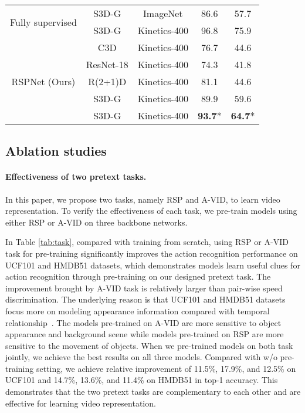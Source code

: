 \documentclass[final]{cvpr}
\begin{document}
\begin{table*}[ht]
\begin{tabular}{ccccc}
		
\hline
		\multirow{2}{*}{Fully supervised} & S3D-G & ImageNet & 86.6  &  57.7  \\
		& S3D-G & Kinetics-400    & 96.8  &  75.9 \\
		\hline
		\multirow{5}{*}{RSPNet (Ours)} & C3D       & Kinetics-400 &  76.7  & 44.6     \\
		& ResNet-18        & Kinetics-400 &  74.3  &   41.8     \\ 
		& R(2+1)D      & Kinetics-400 &  81.1  &   44.6     \\ 
		& S3D-G        & Kinetics-400 &      89.9  &   59.6      \\ 
		& S3D-G        & Kinetics-400 &  \textbf{93.7}*  & \textbf{64.7}*       \\ 
\hline
	\end{tabular}
	\label{tab:sota}
\end{table*}



\subsection{Ablation studies}

\paragraph{Effectiveness of two pretext tasks.}
In this paper, we propose two tasks, namely RSP and A-VID, to learn video representation. To verify the effectiveness of each task, we pre-train models using either RSP or A-VID on three backbone networks.  

In Table \ref{tab:task}, compared with training from scratch, using RSP or A-VID task for pre-training significantly improves the action recognition performance on UCF101 and HMDB51 datasets, which demonstrates models learn useful clues for action recognition through pre-training on our designed pretext task.
The improvement brought by A-VID task is relatively larger than pair-wise speed discrimination. The underlying reason is that UCF101 and HMDB51 datasets focus more on modeling appearance information compared with temporal relationship~\cite{LinGH19}. The models pre-trained on A-VID are more sensitive to object appearance and background scene while models pre-trained on RSP are more sensitive to the movement of objects.
When we pre-trained models on both task jointly, we achieve the best results on all three models. Compared with w/o pre-training setting, we achieve relative improvement of 11.5\%, 17.9\%, and 12.5\% on UCF101 and 14.7\%, 13.6\%, and 11.4\% on HMDB51 in top-1 accuracy. This demonstrates that the two pretext tasks are complementary to each other and are effective for learning video representation.
\end{document}
